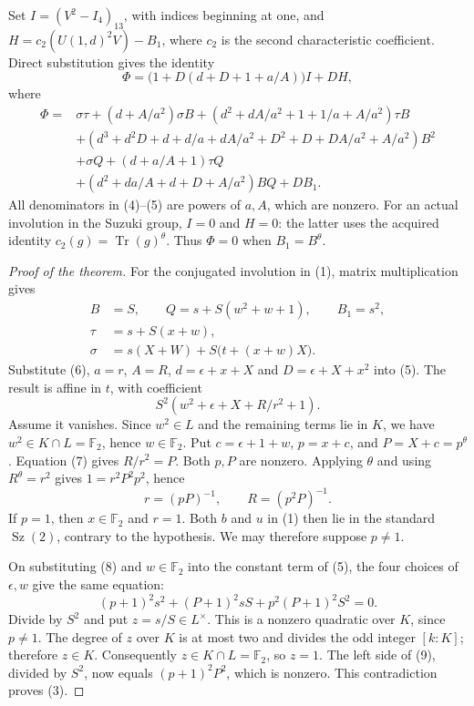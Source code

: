 \documentclass[11pt,a4paper]{article}
\newcommand{\Sz}{\operatorname{Sz}}
\begin{document}
Set $I=(V^2-I_4)_{13}$, with indices beginning at one, and
$H=c_2(U(1,d)^2V)-B_1$, where $c_2$ is the second characteristic
coefficient. Direct substitution gives the identity
\[
 \Phi=\bigl(1+D(d+D+1+a/A)\bigr)I+DH,                    \tag{4}
\]
where
\begin{align*}
\Phi={}&\sigma\tau+(d+A/a^2)\sigma B
 +(d^2+dA/a^2+1+1/a+A/a^2)\tau B\\
&+(d^3+d^2D+d+d/a+dA/a^2+D^2+D+DA/a^2+A/a^2)B^2\\
&+\sigma Q+(d+a/A+1)\tau Q\\
&+(d^2+da/A+d+D+A/a^2)BQ+DB_1.            \tag{5}
\end{align*}
All denominators in (4)--(5) are powers of $a,A$, which are nonzero.
For an actual involution in the Suzuki group, $I=0$ and $H=0$:
the latter uses the acquired identity $c_2(g)=\operatorname{Tr}(g)^\theta$.
Thus $\Phi=0$ when $B_1=B^\theta$.

\begin{proof}[Proof of the theorem]
For the conjugated involution in (1), matrix multiplication gives
\[
 \begin{split}
 B&=S,\qquad Q=s+S(w^2+w+1),\qquad B_1=s^2,\\
 \tau&=s+S(x+w),\\
 \sigma&=s(X+W)+S\bigl(t+(x+w)X\bigr).
 \end{split}                                                   \tag{6}
\]
Substitute (6), $a=r$, $A=R$, $d=\epsilon+x+X$ and
$D=\epsilon+X+x^2$ into (5). The result is affine in $t$, with coefficient
\[
                    S^2(w^2+\epsilon+X+R/r^2+1).          \tag{7}
\]
Assume it vanishes. Since $w^2\in L$ and the remaining terms lie in $K$,
we have $w^2\in K\cap L=\mathbb F_2$, hence $w\in\mathbb F_2$.
Put $c=\epsilon+1+w$, $p=x+c$, and $P=X+c=p^\theta$.
Equation (7) gives $R/r^2=P$. Both $p,P$ are nonzero.
Applying $\theta$ and using $R^\theta=r^2$ gives
$1= r^2P^2p^2$, hence
\[
                       r=(pP)^{-1},\qquad R=(p^2P)^{-1}.   \tag{8}
\]
If $p=1$, then $x\in\mathbb F_2$ and $r=1$. Both $b$ and $u$ in
(1) then lie in the standard $\Sz(2)$, contrary to the hypothesis.
We may therefore suppose $p\ne1$.

On substituting (8) and $w\in\mathbb F_2$ into the constant term of
(5), the four choices of $\epsilon,w$ give the same equation:
\[
 (p+1)^2s^2+(P+1)^2sS+p^2(P+1)^2S^2=0.                 \tag{9}
\]
Divide by $S^2$ and put $z=s/S\in L^\times$.
This is a nonzero quadratic over $K$, since $p\ne1$.
The degree of $z$ over $K$ is at most two and divides the odd integer
$[k:K]$; therefore $z\in K$. Consequently
$z\in K\cap L=\mathbb F_2$, so $z=1$.
The left side of (9), divided by $S^2$, now equals
$(p+1)^2P^2$, which is nonzero. This contradiction proves (3).
\end{proof}
\end{document}
